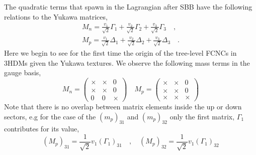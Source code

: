 %
%
The quadratic terms that spawn in the Lagrangian after SBB have the following relations to the Yukawa matrices,
% 
\begin{equation}
\label{eq:3HDM_Quark_gauge_mass}
\begin{split}
M_n = \frac{v_1}{\sqrt{2}} \Gamma_1 +  \frac{v_2}{\sqrt{2}} \Gamma_2 +  \frac{v_3}{\sqrt{2}} \Gamma_3  \quad , \\ 
M_p = \frac{v_1}{\sqrt{2}} \Delta_1 +  \frac{v_2}{\sqrt{2}} \Delta_2 +  \frac{v_3}{\sqrt{2}} \Delta_3   \quad .
\end{split}
\end{equation}
%
Here we begin to see for the first time the origin of the tree-level FCNCs in 3HDMs given the Yukawa textures. We observe the following mass terms in the gauge basis, 
%
\begin{equation}
M_n = \begin{pmatrix}
\times & \times & 0 \\
\times & \times & 0 \\
0 & 0 & \times 
\end{pmatrix} 
\quad 
M_p=\begin{pmatrix}
\times & \times & 0 \\
\times & \times & 0 \\
\times & \times & \times 
\end{pmatrix}
\end{equation}
%
Note that there is no overlap between matrix elements inside the up or down sectors, e.g for the case of the $(m_p)_{31}$ and $(m_p)_{32}$ only the first matrix, $\Gamma_1$ contributes for its value, 
\begin{equation}
(M_p)_{31} = \frac{1}{\sqrt{2}} v_1 (\Gamma_1)_{31} \quad , \quad (M_p)_{32} = \frac{1}{\sqrt{2}} v_1 (\Gamma_1)_{32} 
\end{equation}


